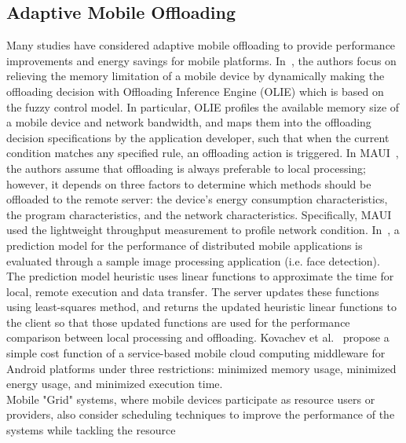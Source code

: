 \documentclass[10pt, conference, compsocconf]{IEEEtran}
\begin{document}
\subsection{Adaptive Mobile Offloading}
Many studies have considered adaptive mobile offloading
to provide performance improvements and energy savings for 
mobile platforms.
%
In~\cite{xiaohui}, the authors focus on relieving the memory limitation
of a mobile device by dynamically making the offloading decision with
Offloading Inference Engine (OLIE) which is based on the fuzzy control
model.
%
In particular, OLIE profiles the available memory size of a mobile
device and network bandwidth, and maps them into the offloading decision
specifications by the application developer, such that when the current
condition matches any specified rule, an offloading action is triggered.
%
In MAUI~\cite{maui}, the authors assume that offloading is always
preferable to local processing; however, it depends on three factors to
determine which methods should be offloaded to the remote server: the
device's energy consumption characteristics, the program characteristics,
and the network characteristics.
%
%
Specifically, MAUI used the lightweight throughput measurement to profile
network condition.
%
%
In~\cite{shigeru}, a prediction model for the performance of
distributed mobile applications is evaluated through a sample image
processing application (i.e. face detection).
%
The prediction model heuristic uses linear functions to
approximate the time for local, remote execution and data transfer.
%
The server updates these functions using least-squares
method, and returns the updated heuristic linear functions to the client 
so that those updated functions are used for the performance comparison
between local processing and offloading.
%
Kovachev et al.~\cite{dejan} propose a simple cost function of
a service-based mobile cloud computing middleware for Android platforms
under three restrictions: minimized memory usage, minimized energy
usage, and minimized execution time.\\
%
\indent Mobile "Grid" systems, where mobile devices participate as 
resource users or providers, also consider scheduling techniques to 
improve the performance of the systems while tackling the resource
\end{document}
